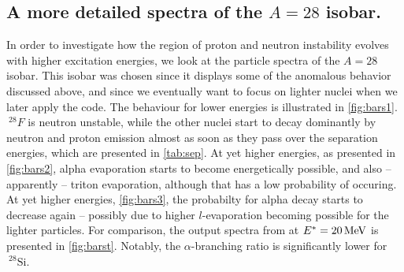 \subsection{A more detailed spectra of the $A=28$ isobar.}
In order to investigate how the region of proton and neutron instability evolves with higher excitation energies, we look at the particle spectra of the $A=28$ isobar. This isobar was chosen since it displays some of the anomalous behavior discussed above, and since we eventually want to focus on lighter nuclei when we later apply the code. The behaviour for lower energies is illustrated in \autoref{fig:bars1}. $~^{28}F$ is neutron unstable, while the other nuclei start to decay dominantly by neutron and proton emission almost as soon as they pass over the separation energies, which are presented in \autoref{tab:sep}. At yet higher energies, as presented in \autoref{fig:bars2}, alpha evaporation starts to become energetically possible, and also -- apparently -- triton evaporation, although that has a low probability of occuring. At yet higher energies, \autoref{fig:bars3}, the probabilty for alpha decay starts to decrease again -- possibly due to higher $l$-evaporation becoming possible for the lighter particles. For comparison, the output spectra from  at $E^*=\unit[20]{MeV}$ is presented in \autoref{fig:barst}. Notably, the $\alpha$-branching ratio is significantly lower for $~^{28}\mathrm{Si}$.

